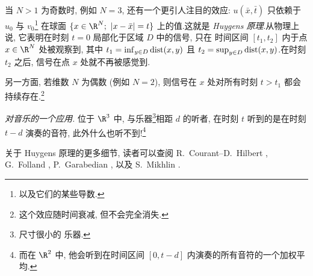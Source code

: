 当 $N>1$ 为奇数时, 例如 $N=3$, 还有一个更引人注目的效应:
$u(\bar x,\bar t)$ 只依赖于 $u_0$ 与 $v_0$\footnote{以及它们的某些导数.}
在球面 $\{x\in\R^N;\ \abs{x-\bar x}=t\}$ 上的值.这就是 \emph{Huygens
原理}.从物理上说, 它表明在时刻 $t=0$ 局部化于区域 $D$ 中的信号, 只在
时间区间 $[t_1,t_2]$ 内于点 $x\in\R^N$ 处被观察到, 其中
$t_1=\inf_{y\in D}\operatorname{dist}(x,y)$ 且 $t_2=\sup_{y\in D}\operatorname{dist}(x,y)$.在时刻
$t_2$ 之后, 信号在点 $x$ 处就不再被感觉到.

另一方面, 若维数 $N$ 为偶数 (例如 $N=2$), 则信号在 $x$ 处对所有时刻
$t>t_1$ 都会持续存在.\footnote{这个效应随时间衰减, 但不会完全消失.}

\emph{对音乐的一个应用.} 位于 $\R^3$ 中, 与乐器\footnote{尺寸很小的
乐器.}相距 $d$ 的听者, 在时刻 $t$ 听到的是在时刻 $t-d$ 演奏的音符,
此外什么也听不到!\footnote{而在 $\R^2$ 中, 他会听到在时间区间 $[0,t-d]$
内演奏的所有音符的一个加权平均.}

关于 Huygens 原理的更多细节, 读者可以查阅 R.~Courant--D.~Hilbert
, G.~Folland ,
P.~Garabedian , 以及 S.~Mikhlin
.
